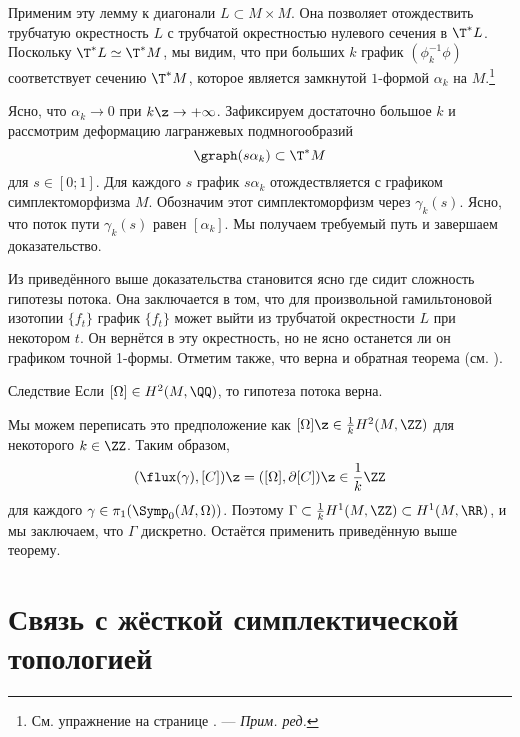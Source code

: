 Применим эту лемму к диагонали $L \subset M \times M$.
Она позволяет отождествить трубчатую окрестность $L$ с трубчатой
окрестностью нулевого сечения в $\T^\ast L$. 
Поскольку $\T^\ast L \simeq \T^\ast M$, мы видим, что при больших $k$
график $(\phi_k^{-1}\phi)$ соответствует сечению $\T^\ast M$, которое
является замкнутой $1$-формой $\alpha_k$ на
$M$.\footnote{См. упражнение на странице
  \pageref{1-form-lagrange}. --- \textit{Прим. ред.}} 

Ясно, что $\alpha_k \to 0$ при $k\z\to +\infty$.
Зафиксируем достаточно большое $k$ и рассмотрим деформацию лагранжевых
подмногообразий  
\[\graph (s\alpha_k) \subset \T^\ast M\]
для $s \in [0;1]$.
Для каждого $s$ график $s\alpha_k$ отождествляется с графиком симплектоморфизма $M$.
Обозначим этот симплектоморфизм через $\gamma_k(s)$.
Ясно, что поток пути $\gamma_k(s)$ равен $[\alpha_k]$.
Мы получаем требуемый путь и завершаем доказательство.
\qeds

Из приведённого выше доказательства становится ясно где сидит
сложность гипотезы потока. 
Она заключается в том, что для произвольной гамильтоновой изотопии
$\{f_t\}$ график $\{f_t\}$ может выйти из трубчатой окрестности $L$
при некотором $t$. 
Он вернётся в эту окрестность, но не ясно останется ли он графиком
точной 1-формы. 
Отметим также, что верна и обратная теорема (см. \cite{LMP1}).

\begin{thm}{Следствие}
Если $[\Omega] \in H^2(M, \QQ)$, то гипотеза потока верна.
\end{thm}

Мы можем переписать это предположение как $[\Omega] \z\in
\tfrac1kH^2(M, \ZZ)$ для некоторого $k\in\ZZ$.
Таким образом,
\[(\flux(\gamma), [C]) \z= ([\Omega], \partial[C]) \z\in \frac1k\ZZ\]
для каждого $\gamma \in \pi_1(\Symp_0(M,\Omega))$. 
Поэтому $\Gamma\subset \tfrac1k H^1(M,\ZZ)\subset H^1(M,\RR)$, и мы
заключаем, что $\Gamma$ дискретно. 
Остаётся применить приведённую выше теорему.
\qeds

\section{Связь с жёсткой симплектической топологией}

